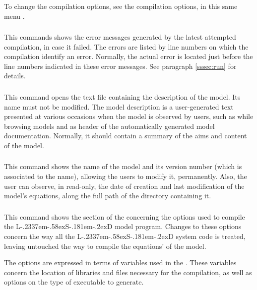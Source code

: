 \documentclass [11pt,a4paper] {book}
\def\LsD{{L\kern-.2337em\lower-.58ex\hbox{S}\kern-.181em\lower-.2ex\hbox{D}}\xspace}
\begin{document}
To change the compilation options, see the compilation options, in this same menu .

\subsubsection{}

This commands shows the error messages generated by the latest attempted compilation, in case it failed. The errors are listed by line numbers on which the compilation identify an error. Normally, the actual error is located just before the line numbers indicated in these error messages. See paragraph \ref{sssec:run} for details.

\subsubsection{}

This command opens the text file containing the description of the model. Its name must not be modified. The model description is a user-generated text presented at various occasions when the model is observed by users, such as while browsing models and as header of the automatically generated model documentation. Normally, it should contain a summary of the aims and content of the model.

\subsubsection{}

This command shows the name of the model and its version number (which is associated to the name), allowing the users to modify it, permanently. Also, the user can observe, in read-only, the date of creation and last modification of the model's equations, along the full path of the directory containing it.

\subsubsection{}

This command shows the section of the  concerning the options used to compile the \LsD model program. Changes to these options concern the way all the \LsD system code is treated, leaving untouched the way to compile the equations' of the model.

The options are expressed in terms of variables used in the . These variables concern the location of libraries and files necessary for the compilation, as well as options on the type of executable to generate.
\end{document}
